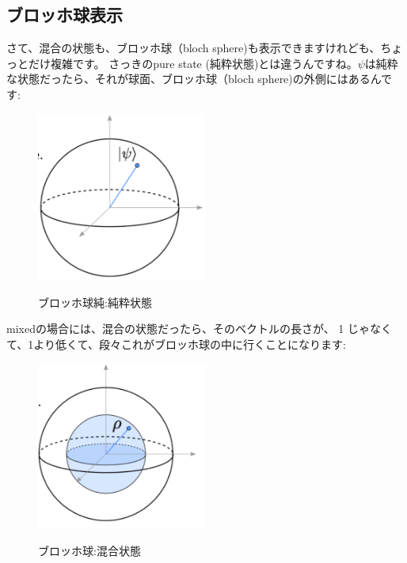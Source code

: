 \subsection{ブロッホ球表示}
さて、混合の状態も、ブロッホ球（bloch sphere)も表示できますけれども、ちょっとだけ複雑です。
さっきのpure state (純粋状態)とは違うんですね。$\psi$は純粋な状態だったら、それが球面、ブロッホ球（bloch sphere)の外側にはあるんです:
\begin{figure}[H]
    \centering
    \includegraphics[width=0.5\textwidth]{lesson3/bloch_pure_state.pdf}
    \label{fig: 1}
    \begin{center}
        \caption{ブロッホ球純:純粋状態}
    \end{center}
\end{figure}
mixedの場合には、混合の状態だったら、そのベクトルの長さが、
1 じゃなくて、1より低くて、段々これがブロッホ球の中に行くことになります:
\begin{figure}[H]
    \centering
    \includegraphics[width=0.5\textwidth]{lesson3/bloch_mixed_state.pdf}
    \label{fig: 1}
    \begin{center}
        \caption{ブロッホ球:混合状態}
    \end{center}
\end{figure}
